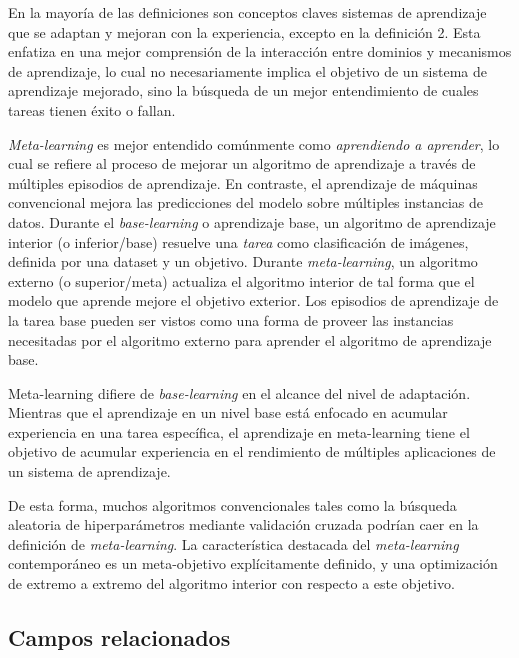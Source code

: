 En la mayoría de las definiciones son conceptos claves sistemas de aprendizaje que se adaptan y mejoran con la experiencia, excepto en la definición 2. Esta enfatiza en una mejor comprensión de la interacción entre dominios y mecanismos de aprendizaje, lo cual no necesariamente implica el objetivo de un sistema de aprendizaje mejorado, sino la búsqueda de un mejor entendimiento de cuales tareas tienen éxito o fallan.

\emph{Meta-learning} es mejor entendido comúnmente como \textit{aprendiendo a aprender}, lo cual se refiere al proceso de mejorar un algoritmo de aprendizaje a través de múltiples episodios de aprendizaje. En contraste, el aprendizaje de máquinas convencional mejora las predicciones del modelo sobre múltiples instancias de datos. Durante el \textit{base-learning} o aprendizaje base, un algoritmo de aprendizaje interior (o inferior/base) resuelve una \textit{tarea} como clasificación de imágenes, definida por una dataset y un objetivo. Durante \emph{meta-learning}, un algoritmo externo (o superior/meta) actualiza el algoritmo interior de tal forma que el modelo que aprende mejore el objetivo exterior. Los episodios de aprendizaje de la tarea base pueden ser vistos como una forma de proveer las instancias necesitadas por el algoritmo externo para aprender el algoritmo de aprendizaje base. 

Meta-learning difiere de \textit{base-learning} en el alcance del nivel de adaptación. Mientras que el aprendizaje en un nivel base está enfocado en acumular experiencia en una tarea específica, el aprendizaje en meta-learning tiene el objetivo de acumular experiencia en el rendimiento de múltiples aplicaciones de un sistema de aprendizaje.  

De esta forma, muchos algoritmos convencionales tales como la búsqueda aleatoria de hiperparámetros mediante validación cruzada podrían caer en la definición de \emph{meta-learning}. La característica destacada del \emph{meta-learning} contemporáneo es un meta-objetivo explícitamente definido, y una optimización de extremo a extremo del algoritmo interior con respecto a este objetivo.

\subsection{Campos relacionados}\label{subsec:mtl_related_fields}


